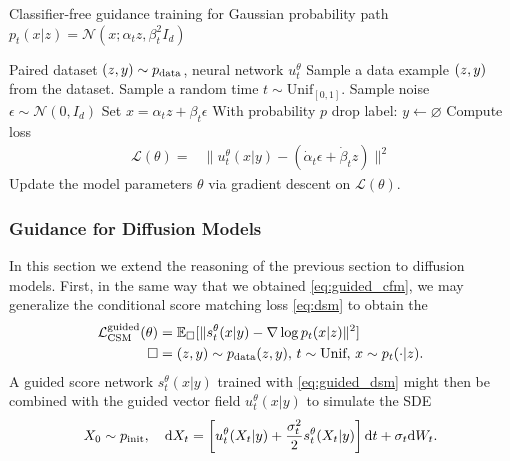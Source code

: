 \begin{algorithm}[h]
\caption{Classifier-free guidance training for Gaussian probability path $p_t(x|z)=\mathcal{N}(x;\alpha_tz,\beta_t^2I_d)$}
\label{alg:training_fm_score_matching_gaussian_paths}
\begin{algorithmic}[1]
\REQUIRE Paired dataset $(z,y)\sim p_{\rm{data}}$, neural network $u_t^\theta$
    \STATE Sample a data example $(z,y)$ from the dataset.
    \STATE Sample a random time $t \sim \text{Unif}_{[0,1]}$.
    \STATE Sample noise $\epsilon\sim\mathcal{N}(0,I_d)$
    \STATE Set $x=\alpha_t z + \beta_t \epsilon$
    \STATE With probability $p$ drop label: $y\leftarrow \varnothing$
    \STATE Compute loss
    \begin{align*}
        \mathcal{L}(\theta) =& \|u_t^\theta(x|y)-(\dot{\alpha}_t\epsilon+\dot{\beta}_tz)\|^2 
    \end{align*}
    \STATE Update the model parameters $\theta$ via gradient descent on $\mathcal{L}(\theta)$.
\ENDFOR
\end{algorithmic}
\end{algorithm}

\subsubsection{Guidance for Diffusion Models}
In this section we extend the reasoning of the previous section to diffusion models. First, in the same way that we obtained \cref{eq:guided_cfm}, we may generalize the conditional score matching loss \cref{eq:dsm} to obtain the 
\begin{align}
    \label{eq:guided_dsm}
    \mathcal{L}_{\text{CSM}}^{\text{guided}}(\theta) &= \mathbb{E}_{\square}[\|s_t^\theta(x|y) - \nabla\log p_t(x|z)\|^2]\\
    \square &= (z,y)\sim p_{\rm{data}}(z,y), \,t\sim \text{Unif},\,x\sim p_t(\cdot|z).
\end{align}
A guided score network $s_t^\theta(x|y)$ trained with \cref{eq:guided_dsm} might then be combined with the guided vector field $u_t^\theta(x|y)$ to simulate the SDE
\begin{equation*}
    X_0 \sim p_{\rm{init}},\quad \mathrm{d} X_t = \left[u_t^\theta(X_t|y)+\frac{\sigma_t^2}{2}s_t^\theta(X_t|y)\right]\mathrm{d} t + \sigma_t\mathrm{d} W_t.
\end{equation*}

